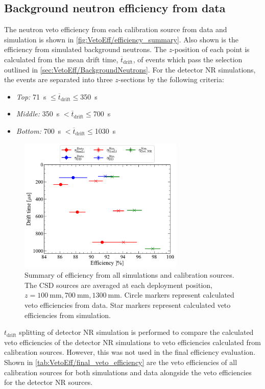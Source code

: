 \subsection{Background neutron efficiency from data}\label{sec:VetoEff/BkgNeutronEff}
The neutron veto efficiency from each calibration source from data and simulation is shown in \autoref{fig:VetoEff/efficiency_summary}. Also shown is the efficiency from simulated background neutrons.
The $z$-position of each point is calculated from the mean drift time, $\overline{t}_{\text{drift}}$, of events which pass the selection outlined in \autoref{sec:VetoEff/BackgroundNeutrons}.
For the detector NR simulations, the events are separated into three $z$-sections by the following criteria:
\begin{itemize}
    \item \textit{Top:} 71~\textmu s $\leq\overline{t}_{\text{drift}}\leq$350~\textmu s
    \item \textit{Middle:} 350~\textmu s $<\overline{t}_{\text{drift}}\leq$700~\textmu s
    \item \textit{Bottom:} 700~\textmu s $<\overline{t}_{\text{drift}}\leq$1030~\textmu s
\end{itemize}

\begin{figure}[!ht]
	\centering
	\includegraphics[width=0.7\textwidth]{figures/VetoEfficiency/SummaryPlot.pdf}
	\caption[Summary of efficiency from all simulations and calibration sources.]{Summary of efficiency from all simulations and calibration sources. The CSD sources are averaged at each deployment position, $z=100~\text{mm},700~\text{mm},1300~\text{mm}$. Circle markers represent calculated veto efficiencies from data. Star markers represent calculated veto efficiencies from simulation.}
	\label{fig:VetoEff/efficiency_summary}
\end{figure}
$t_{\text{drift}}$ splitting of detector NR simulation is performed to compare the calculated veto efficiencies of the detector NR simulations to veto efficiencies calculated from calibration sources. However, this was not used in the final efficiency evaluation. Shown in \autoref{tab:VetoEff/final_veto_efficiency} are the veto efficiencies of all calibration sources for both simulations and data alongside the veto efficiencies for the detector NR sources.


